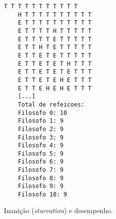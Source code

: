 \begin{parts}
\begin{solution}
    \begin{Verbatim}[label={\$ ./prog4}]
    T T T T T T T T T T T 
    H T T T T T T T T T T 
    E T T T T T T T T T T 
    E T T T T H T T T T T 
    E T T T T E T T T T T 
    E T T H T E T T T T T 
    E T T E T E T T T T T 
    E T T E T E T H T T T 
    E T T E T E T E T T T 
    E T T E T E H E T T T 
    E T T E H E H E T T T 
    [...]
    Total de refeicoes: 
    Filosofo 0: 10
    Filosofo 1: 9
    Filosofo 2: 9
    Filosofo 3: 9
    Filosofo 4: 9
    Filosofo 5: 9
    Filosofo 6: 9
    Filosofo 7: 9
    Filosofo 8: 9
    Filosofo 9: 9
    Filosofo 10: 9
    \end{Verbatim}
  \end{solution}
\end{parts}

\question
Inanição (\emph{starvation}) e desempenho.

